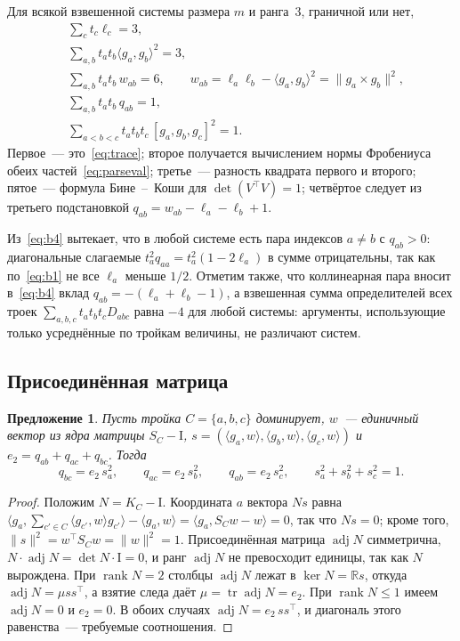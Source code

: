\documentclass[11pt,a4paper]{article}
\theoremstyle{plain}
\newtheorem{proposition}[theorem]{Предложение}
\theoremstyle{definition}
\theoremstyle{remark}
\DeclareMathOperator{\tr}{tr}
\DeclareMathOperator{\adj}{adj}
\DeclareMathOperator{\rank}{rank}
\newcommand{\RR}{\mathbb{R}}
\newcommand{\Id}{\mathrm{I}}
\newcommand{\T}{^{\!\top}}
\begin{document}
Для всякой взвешенной системы размера $m$ и ранга~3, граничной или нет,
\begin{align}
  &\textstyle\sum_c t_c\ell_c=3, \label{eq:b1}\\
  &\textstyle\sum_{a,b}t_at_b\langle g_a,g_b\rangle^2=3, \label{eq:b2}\\
  &\textstyle\sum_{a,b}t_at_b\,w_{ab}=6,\qquad
    w_{ab}=\ell_a\ell_b-\langle g_a,g_b\rangle^2=\|g_a\times g_b\|^2, \label{eq:b3}\\
  &\textstyle\sum_{a,b}t_at_b\,q_{ab}=1, \label{eq:b4}\\
  &\textstyle\sum_{a<b<c}t_at_bt_c\,[g_a,g_b,g_c]^2=1. \label{eq:b5}
\end{align}
Первое~--- это~\eqref{eq:trace}; второе получается вычислением нормы Фробениуса
обеих частей~\eqref{eq:parseval}; третье~--- разность квадрата первого и
второго; пятое~--- формула Бине~--~Коши для $\det(V\T V)=1$; четвёртое следует
из третьего подстановкой $q_{ab}=w_{ab}-\ell_a-\ell_b+1$.

Из~\eqref{eq:b4} вытекает, что в любой системе есть пара индексов $a\ne b$
с $q_{ab}>0$: диагональные слагаемые $t_a^2q_{aa}=t_a^2(1-2\ell_a)$ в сумме
отрицательны, так как по~\eqref{eq:b1} не все $\ell_a$ меньше $1/2$. Отметим
также, что коллинеарная пара вносит в~\eqref{eq:b4} вклад
$q_{ab}=-(\ell_a+\ell_b-1)$, а взвешенная сумма определителей всех троек
$\sum_{a,b,c}t_at_bt_cD_{abc}$ равна $-4$ для любой системы: аргументы,
использующие только усреднённые по тройкам величины, не различают систем.

\subsection{Присоединённая матрица}\label{sub:adj}

\begin{proposition}\label{prop:adj}
Пусть тройка $C=\{a,b,c\}$ доминирует, $w$~--- единичный вектор из ядра
матрицы $S_C-\Id$, $s=(\langle g_a,w\rangle,\langle g_b,w\rangle,\langle g_c,w\rangle)$
и $e_2=q_{ab}+q_{ac}+q_{bc}$. Тогда
\[
  q_{bc}=e_2\,s_a^2,\qquad q_{ac}=e_2\,s_b^2,\qquad q_{ab}=e_2\,s_c^2,
  \qquad s_a^2+s_b^2+s_c^2=1 .
\]
\end{proposition}
\begin{proof}
Положим $N=K_C-\Id$. Координата $a$ вектора $Ns$ равна
$\bigl\langle g_a,\sum_{c'\in C}\langle g_{c'},w\rangle g_{c'}\bigr\rangle-\langle g_a,w\rangle
=\langle g_a,S_Cw-w\rangle=0$, так что $Ns=0$; кроме того,
$\|s\|^2=w\T S_Cw=\|w\|^2=1$. Присоединённая матрица $\adj N$ симметрична,
$N\cdot\adj N=\det N\cdot\Id=0$, и ранг $\adj N$ не превосходит единицы, так
как $N$ вырождена. При $\rank N=2$ столбцы $\adj N$ лежат в $\ker N=\RR s$,
откуда $\adj N=\mu ss\T$, а взятие следа даёт $\mu=\tr\adj N=e_2$. При
$\rank N\le1$ имеем $\adj N=0$ и $e_2=0$. В обоих случаях
$\adj N=e_2\,ss\T$, и диагональ этого равенства~--- требуемые соотношения.
\end{proof}
\end{document}
